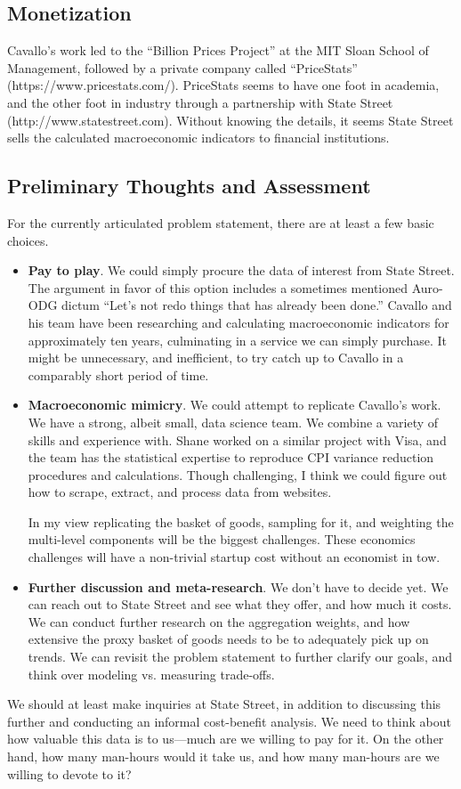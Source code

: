\documentclass{article}
\begin{document}
\subsection*{Monetization}
Cavallo's work led to the ``Billion Prices Project'' at the MIT Sloan School of Management, followed by a private company called ``PriceStats'' (https://www.pricestats.com/). PriceStats seems to have one foot in academia, and the other foot in industry through a partnership with State Street (http://www.statestreet.com). Without knowing the details, it seems State Street sells the calculated macroeconomic indicators to financial institutions.

\subsection*{Preliminary Thoughts and Assessment}
For the currently articulated problem statement, there are at least a few basic choices. 
\begin{itemize}
\item {\bf Pay to play}. We could simply procure the data of interest from State Street. The argument in favor of this option includes a sometimes mentioned Auro-ODG dictum ``Let's not redo things that has already been done.'' Cavallo and his team have been researching and calculating macroeconomic indicators for approximately ten years, culminating in a service we can simply purchase.  It might be unnecessary, and inefficient, to try catch up to Cavallo in a comparably short period of time.
\item {\bf Macroeconomic mimicry}. We could attempt to replicate Cavallo's work. We have a strong, albeit small, data science team. We combine a variety of skills and experience with. Shane worked on a similar project with Visa, and the team has the statistical expertise to reproduce CPI variance reduction procedures and calculations. Though challenging, I think we could figure out how to scrape, extract, and process data from websites. 

In my view replicating the basket of goods, sampling for it, and weighting the multi-level components will be the biggest challenges. These economics challenges will have a non-trivial startup cost without an economist in tow.
\item {\bf Further discussion and meta-research}. We don't have to decide yet. We can reach out to State Street and see what they offer, and how much it costs. We can conduct further research on the aggregation weights, and how extensive the proxy basket of goods needs to be to adequately pick up on trends. We can revisit the problem statement to further clarify our goals, and think over modeling vs. measuring trade-offs. 


\end{itemize}
We should at least make inquiries at State Street, in addition to  discussing this further and conducting an informal cost-benefit analysis. We need to think about how valuable this data is to us---much are we willing to pay for it. On the other hand, how many man-hours would it take us, and how many man-hours are we willing to devote to it?
\end{document}
